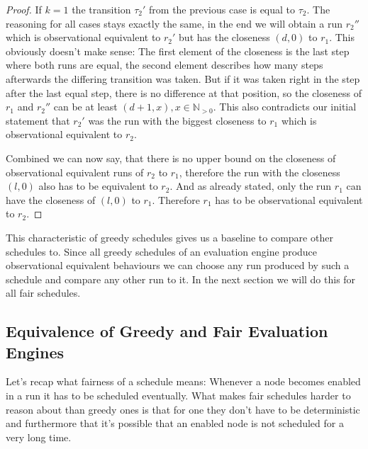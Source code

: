 \begin{proof}
  If \(k = 1\) the transition \(\tau_2'\) from the previous case is equal to \(\tau_2\).
  The reasoning for all cases stays exactly the same, in the end we will obtain a run \(r_2''\) which is observational equivalent to \(r_2'\) but has the closeness \((d, 0)\) to \(r_1\).
  This obviously doesn't make sense: The first element of the closeness is the last step where both runs are equal, the second element describes how many steps afterwards the differing transition was taken.
  But if it was taken right in the step after the last equal step, there is no difference at that position, so the closeness of \(r_1\) and \(r_2''\) can be at least \((d+1, x), x \in \mathbb{N}_{>0}\).
  This also contradicts our initial statement that \(r_2'\) was the run with the biggest closeness to \(r_1\) which is observational equivalent to \(r_2\).

  Combined we can now say, that there is no upper bound on the closeness of observational equivalent runs of \(r_2\) to \(r_1\), therefore the run with the closeness \((l, 0)\) also has to be equivalent to \(r_2\).
  And as already stated, only the run \(r_1\) can have the closeness of \((l, 0)\) to \(r_1\).
  Therefore \(r_1\) has to be observational equivalent to \(r_2\).
\end{proof}

This characteristic of greedy schedules gives us a baseline to compare other schedules to.
Since all greedy schedules of an evaluation engine produce observational equivalent behaviours we can choose any run produced by such a schedule and compare any other run to it.
In the next section we will do this for all fair schedules.

\subsection{Equivalence of Greedy and Fair Evaluation Engines}
\label{sec:behaviours:equivalence_without_timing:greedy_fair}

Let's recap what fairness of a schedule means: Whenever a node becomes enabled in a run it has to be scheduled eventually.
What makes fair schedules harder to reason about than greedy ones is that for one they don't have to be deterministic and furthermore that it's possible that an enabled node is not scheduled for a very long time.


